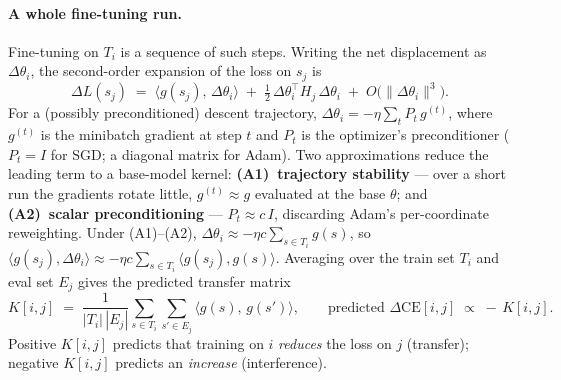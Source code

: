 \documentclass{article} %
\begin{document}
\paragraph{A whole fine-tuning run.}
Fine-tuning on $T_i$ is a sequence of such steps. Writing the net displacement as
$\Delta\theta_i$, the second-order expansion of the loss on $s_j$ is
\begin{equation}
  \Delta L(s_j) \;=\; \big\langle g(s_j),\, \Delta\theta_i\big\rangle
  \;+\; \tfrac{1}{2}\,\Delta\theta_i^{\!\top} H_j\, \Delta\theta_i \;+\; O\!\big(\|\Delta\theta_i\|^3\big).
  \label{eq:runexpand}
\end{equation}
For a (possibly preconditioned) descent trajectory,
$\Delta\theta_i = -\eta\sum_{t} P_t\, g^{(t)}$, where $g^{(t)}$ is the minibatch gradient at step
$t$ and $P_t$ is the optimizer's preconditioner ($P_t=I$ for SGD; a diagonal matrix for Adam).
Two approximations reduce the leading term to a base-model kernel: \textbf{(A1)~trajectory
stability} --- over a short run the gradients rotate little, $g^{(t)}\approx g$ evaluated at the
base $\theta$; and \textbf{(A2)~scalar preconditioning} --- $P_t\approx c\,I$, discarding Adam's
per-coordinate reweighting. Under (A1)--(A2),
$\Delta\theta_i \approx -\eta c\sum_{s\in T_i} g(s)$, so
$\langle g(s_j),\Delta\theta_i\rangle \approx -\eta c\sum_{s\in T_i}\langle g(s_j), g(s)\rangle$.
Averaging over the train set $T_i$ and eval set $E_j$ gives the predicted transfer matrix
\begin{equation}
  K[i,j] \;=\; \frac{1}{|T_i|\,|E_j|}\sum_{s\in T_i}\sum_{s'\in E_j}
             \big\langle g(s),\, g(s')\big\rangle,
  \qquad
  \text{predicted } \Delta\mathrm{CE}[i,j] \;\propto\; -\,K[i,j].
  \label{eq:kernel}
\end{equation}
Positive $K[i,j]$ predicts that training on $i$ \emph{reduces} the loss on $j$ (transfer);
negative $K[i,j]$ predicts an \emph{increase} (interference).
\end{document}
